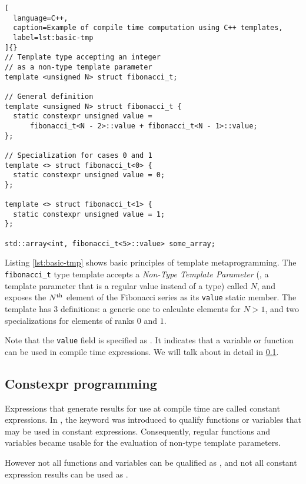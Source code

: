 \documentclass[../main]{subfiles}
\begin{document}
\begin{lstlisting}[
  language=C++,
  caption=Example of compile time computation using C++ templates,
  label=lst:basic-tmp
]{}
// Template type accepting an integer
// as a non-type template parameter
template <unsigned N> struct fibonacci_t;

// General definition
template <unsigned N> struct fibonacci_t {
  static constexpr unsigned value =
      fibonacci_t<N - 2>::value + fibonacci_t<N - 1>::value;
};

// Specialization for cases 0 and 1
template <> struct fibonacci_t<0> {
  static constexpr unsigned value = 0;
};

template <> struct fibonacci_t<1> {
  static constexpr unsigned value = 1;
};

std::array<int, fibonacci_t<5>::value> some_array;
\end{lstlisting}

Listing \ref{lst:basic-tmp} shows basic principles of \cpp template
metaprogramming. The \lstinline{fibonacci_t} type template accepts a
\textit{Non-Type Template Parameter} (\nttp, \ie a template parameter that is
a regular value instead of a type) called $N$, and exposes the
$N\textsuperscript{th}$ element of the Fibonacci series as its
\lstinline{value} static member. The template has 3 definitions:
a generic one to calculate elements for $N > 1$,
and two specializations for elements of ranks $0$ and $1$.

Note that the \lstinline{value} field is specified as \constexpr.
It indicates that a variable or function can be used in compile time
expressions.
We will talk about \constexpr in detail in \ref{lbl:constexpr-programming}.

\subsection{
  Constexpr programming
}
\label{lbl:constexpr-programming}

Expressions that generate results for use at compile time are called
constant expressions. In , the \constexpr keyword was introduced
to qualify functions or variables that may be used in constant expressions.
Consequently, regular functions and variables became usable for the evaluation
of non-type template parameters.

However not all functions and variables can be qualified as \constexpr,
and not all constant expression results can be used as \nttps.
\\
\end{document}
